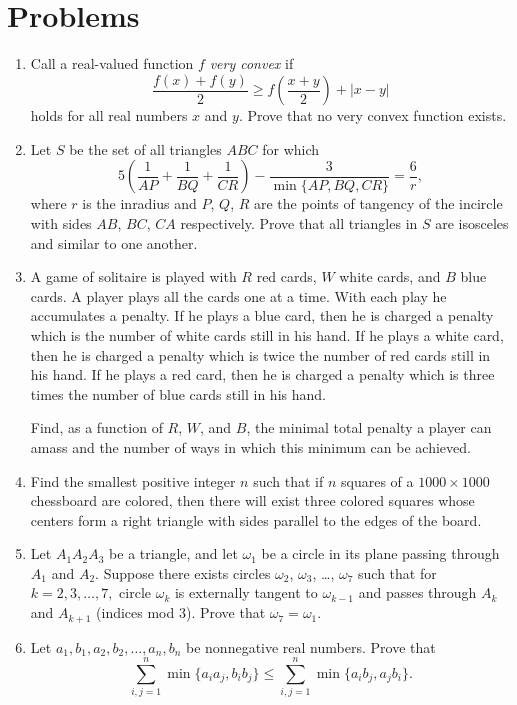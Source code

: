 \documentclass[11pt]{scrartcl}
\begin{document}
\section{Problems}
\begin{enumerate}[\bfseries 1.]
\item %
Call a real-valued function $f$ \emph{very convex} if
\[ \frac{f(x)+f(y)}{2}
  \ge f\left( \frac{x+y}{2} \right) + \left\lvert x-y \right\rvert  \]
holds for all real numbers $x$ and $y$.
Prove that no very convex function exists.

\item %
Let $S$ be the set of all triangles $ABC$ for which
\[ 5 \left( \frac{1}{AP} + \frac{1}{BQ} + \frac{1}{CR} \right)
  - \frac{3}{\min\{ AP, BQ, CR \}} = \frac{6}{r}, \]
where $r$ is the inradius and $P$, $Q$, $R$ are the points of tangency
of the incircle with sides $AB$, $BC$, $CA$ respectively.
Prove that all triangles in $S$ are isosceles and similar to one another.

\item %
A game of solitaire is played with $R$ red cards,
$W$ white cards, and $B$ blue cards.
A player plays all the cards one at a time.
With each play he accumulates a penalty.
If he plays a blue card, then he is charged a penalty
which is the number of white cards still in his hand.
If he plays a white card, then he is charged a penalty
which is twice the number of red cards still in his hand.
If he plays a red card, then he is charged a penalty
which is three times the number of blue cards still in his hand.

Find, as a function of $R$, $W$, and $B$, the minimal total penalty
a player can amass and the number of ways in which this minimum can be achieved.

\item %
Find the smallest positive integer $n$ such
that if $n$ squares of a $1000 \times 1000$ chessboard are colored,
then there will exist three colored squares
whose centers form a right triangle with sides
parallel to the edges of the board.

\item %
Let $A_1 A_2 A_3$ be a triangle,
and let $\omega_1$ be a circle in its plane
passing through $A_1$ and $A_2$.
Suppose there exists circles $\omega_2$, $\omega_3$, \dots, $\omega_7$
such that for $k = 2, 3, \dots, 7,$
circle $\omega_k$ is externally tangent to $\omega_{k-1}$ and passes
through $A_k$ and $A_{k+1}$ (indices mod $3$).
Prove that $\omega_7 = \omega_1$.

\item %
Let $a_1, b_1, a_2, b_2, \dots , a_n, b_n$ be nonnegative real numbers.
Prove that
\[ \sum_{i, j = 1}^{n} \min\{a_i a_j, b_i b_j\}
  \le \sum_{i, j = 1}^{n} \min\{a_i b_j, a_j b_i\}.  \]

\end{enumerate}
\pagebreak
\end{document}
